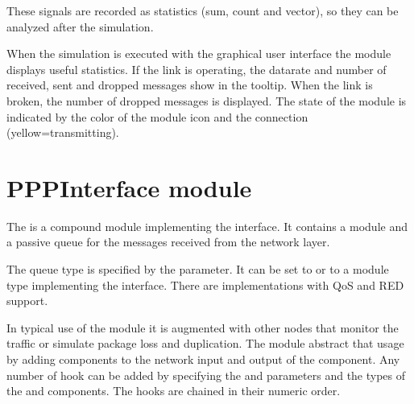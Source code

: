 These signals are recorded as statistics (sum, count and vector), so
they can be analyzed after the simulation.
\fi

When the simulation is executed with the graphical user interface
the module displays useful statistics. If the link is operating,
the datarate and number of received, sent and dropped messages
show in the tooltip. When the link is broken, the number of dropped
messages is displayed. The state of the module is indicated by the color
of the module icon and the connection (yellow=transmitting).

\section{PPPInterface module}

The  is a compound module implementing the 
interface. It contains a  module and a passive queue for the messages
received from the network layer.

The queue type is specified by the  parameter.
It can be set to  or to a module type implementing
the  interface. There are implementations
with QoS and RED support.

In typical use of the  module it is augmented with other nodes
that monitor the traffic or simulate package loss and duplication.
The  module abstract that usage by adding
 components to the network input and output of the
 component. Any number of hook can be added by
specifying the  and 
parameters and the types of the  and 
components. The hooks are chained in their numeric order.




